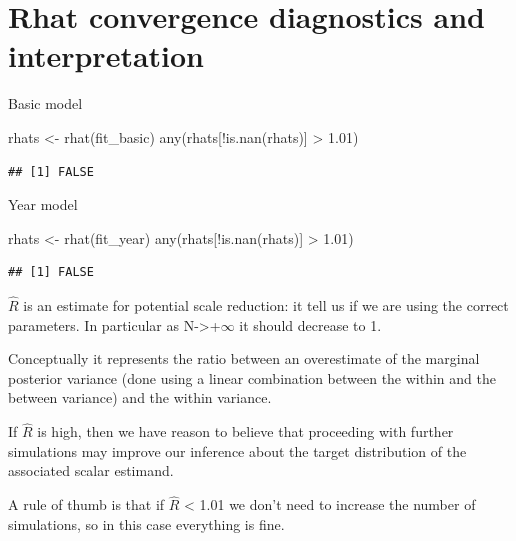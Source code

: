\documentclass[
]{article}
\newenvironment{Shaded}{\begin{snugshade}}{\end{snugshade}}
\newcommand{\FloatTok}[1]{\textcolor[rgb]{0.00,0.00,0.81}{#1}}
\newcommand{\FunctionTok}[1]{\textcolor[rgb]{0.00,0.00,0.00}{#1}}
\newcommand{\NormalTok}[1]{#1}
\newcommand{\OtherTok}[1]{\textcolor[rgb]{0.56,0.35,0.01}{#1}}
\newcommand{\SpecialCharTok}[1]{\textcolor[rgb]{0.00,0.00,0.00}{#1}}
\begin{document}
\hypertarget{rhat-convergence-diagnostics-and-interpretation}{%
\section{Rhat convergence diagnostics and
interpretation}\label{rhat-convergence-diagnostics-and-interpretation}}

Basic model

\begin{Shaded}
\begin{Highlighting}[]
\NormalTok{rhats }\OtherTok{\textless{}{-}} \FunctionTok{rhat}\NormalTok{(fit\_basic)}
\FunctionTok{any}\NormalTok{(rhats[}\SpecialCharTok{!}\FunctionTok{is.nan}\NormalTok{(rhats)] }\SpecialCharTok{\textgreater{}} \FloatTok{1.01}\NormalTok{)}
\end{Highlighting}
\end{Shaded}

\begin{verbatim}
## [1] FALSE
\end{verbatim}

Year model

\begin{Shaded}
\begin{Highlighting}[]
\NormalTok{rhats }\OtherTok{\textless{}{-}} \FunctionTok{rhat}\NormalTok{(fit\_year)}
\FunctionTok{any}\NormalTok{(rhats[}\SpecialCharTok{!}\FunctionTok{is.nan}\NormalTok{(rhats)] }\SpecialCharTok{\textgreater{}} \FloatTok{1.01}\NormalTok{)}
\end{Highlighting}
\end{Shaded}

\begin{verbatim}
## [1] FALSE
\end{verbatim}

\(\hat{R}\) is an estimate for potential scale reduction: it tell us if
we are using the correct parameters. In particular as
N-\textgreater+\(\infty\) it should decrease to 1.

Conceptually it represents the ratio between an overestimate of the
marginal posterior variance (done using a linear combination between the
within and the between variance) and the within variance.

If \(\hat{R}\) is high, then we have reason to believe that proceeding
with further simulations may improve our inference about the target
distribution of the associated scalar estimand.

A rule of thumb is that if \(\hat{R}\) \textless{} 1.01 we don't need to
increase the number of simulations, so in this case everything is fine.
\end{document}
